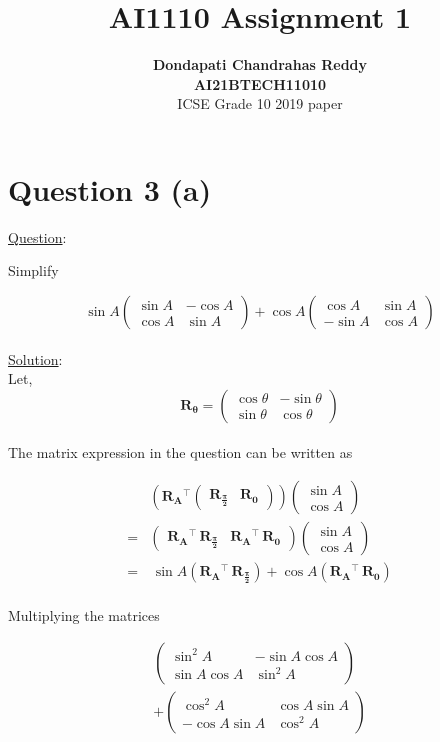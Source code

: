 \documentclass[journal,12pt,twocolumn]{IEEEtran}
\newcommand{\myvec}[1]{\ensuremath{\begin{pmatrix}#1\end{pmatrix}}}
\let\vec\mathbf
\begin{document}
\title{\textbf{AI1110 Assignment 1} }
\author{\textbf{Dondapati Chandrahas Reddy}\\ \textbf{AI21BTECH11010}\\ ICSE Grade 10 2019 paper}

\maketitle

\section {Question 3 (a) \newline}

{\large \underline{Question}:\newline}

Simplify

\begin{equation}
	\sin A\myvec{\sin A &  -\cos A \\ \cos A & \sin A} + \cos A \myvec{\cos A &  \sin A \\ -\sin A & \cos A}
\end{equation}\\

{\large \underline{Solution}:}\\

Let,
\begin{equation}
	\vec{R_\theta} = \myvec{\cos \theta &  -\sin \theta \\ \sin \theta & \cos \theta}
\end{equation}\\

The matrix expression in the question can be written as

\begin{align}
	&\left(\vec{R_A}\!^\top \myvec{\vec{R_{\frac{\pi}{2}}} & \vec{R_0}}\right) \myvec{\sin A \\ \cos A} \\[1em]
	=& \myvec{\vec{R_A}\!^\top \, \vec{R_{\frac{\pi}{2}}} & \vec{R_A}\!^\top \, \vec{R_0}} \myvec{\sin A \\ \cos A} \\[1em]
	=& \, \sin A \left(\vec{R_A}\!^\top \, \vec{R_{\frac{\pi}{2}}}\right) + \cos A \left( \vec{R_A}\!^\top \, \vec{R_0}\right)
\end{align}\\

Multiplying the matrices

\begin{multline}
	\myvec{\sin^2 A &  -\sin A\cos A \\ \sin A\cos A & \sin^2 A} \\ 
	+ \myvec{\cos^2 A & \cos A\sin A \\ -\cos A\sin A & \cos^2 A}
\end{multline}\\
\end{document}
